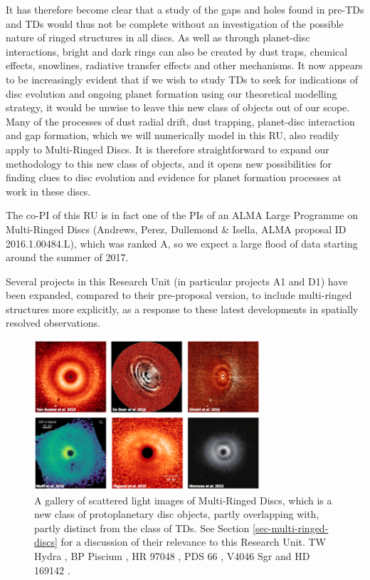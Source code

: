 \documentclass[10pt,fleqn,twoside]{article}
\begin{document}
It has therefore become clear that a study of the gaps and holes found in
pre-TDs and TDs would thus not be complete without an investigation of the
possible nature of ringed structures in all discs. As well as through planet-disc
interactions, bright and dark rings can also be created by dust traps,
chemical effects, snowlines, radiative transfer effects and other
mechanisms. It now appears to be increasingly evident that if we wish to
study TDs to seek for indications of disc evolution and ongoing planet
formation using our theoretical modelling strategy, it would be unwise
to leave this new class of objects out of our scope. Many of the processes of
dust radial drift, dust trapping, planet-disc interaction and gap formation,
which we will numerically model in this RU, 
also readily apply to Multi-Ringed Discs. It is therefore straightforward to expand
our methodology to this new class of objects, and it opens new
possibilities for finding clues to disc evolution and evidence for planet
formation processes at work in these discs.

The co-PI of this RU is in fact one of the PIs of an ALMA Large Programme on
Multi-Ringed Discs (Andrews, Perez, Dullemond \& Isella, ALMA proposal ID
2016.1.00484.L), which was ranked A, so we expect a large flood of data
starting around the summer of 2017. 

Several projects in this Research Unit (in particular projects A1 and D1)
have been expanded, compared to their pre-proposal version, to include
multi-ringed structures more explicitly, as a response to these latest
developments in spatially resolved observations.


\begin{figure}
\centerline{\includegraphics[width=0.75\textwidth]{figures/Ringed_Scat.png}}
\caption{\label{fig-ringed-scat} A gallery of scattered light images of
  Multi-Ringed Discs, which is a new class of protoplanetary disc objects,
  partly overlapping with, partly distinct from the class of TDs. See
  Section \ref{sec-multi-ringed-discs} for a discussion of their relevance
  to this Research Unit. 
  TW Hydra \citep{2016arXiv161008939V}, BP Piscium
  \citep{2017MNRAS.466L...7D}, HR 97048 \citep{2016A&A...595A.112G}, PDS 66
  \citep{2016ApJ...818L..15W}, V4046 Sgr \citep{2015ApJ...803L..10R} and HD
  169142 \citep{2015PASJ...67...83M}.}
\end{figure}
\end{document}
